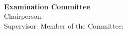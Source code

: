 \begin{titlepage}
\begin{center}
    {\Supervisors}\\
%
\if{}
  \vspace*{\finalAdvisorsSpacing}
\else
  \vspace*{\draftAdvisorsSpacing}
\fi
\if{}
%
\vspace*{1.2cm}
{\Large \textbf{Examination Committee}}\\[.25cm]
    \if{}
    {\large Chairperson:\:}
    {\Chairperson}\\
    \fi
    {\large Supervisor:\:}
    {\Advisor}
    \if{}
    {\large Member of the Committee:\:}
    {\CommitteeMembers}
    \fi
%
\fi

\if{}
 \vspace*{\dateSpacing}
\fi

{\Large \textbf{\Month\:\Year}}\\
\end{center}
\end{titlepage}
